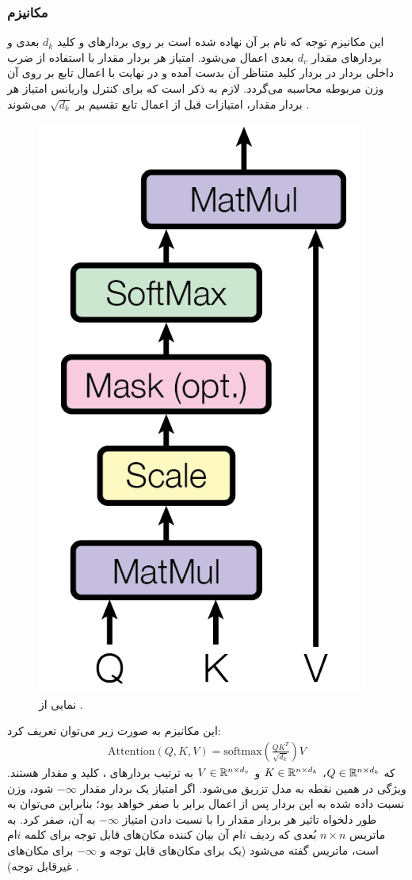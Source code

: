 \subsubsection{مکانیزم
	}
این مکانیزم توجه که نام \dotattention{} بر آن نهاده شده است بر روی بردارهای \query{} و کلید $d_k$ بعدی و بردارهای مقدار $d_v$ بعدی اعمال می‌شود. امتیاز هر بردار مقدار با استفاده از ضرب داخلی بردار \query{} در بردار کلید متناظر آن بدست آمده و در نهایت با اعمال تابع \softmax{} بر روی آن وزن مربوطه محاسبه می‌گردد. لازم به ذکر است که برای کنترل واریانس امتیاز هر بردار مقدار، امتیازات قبل از اعمال تابع \softmax{} تقسیم بر $\sqrt{d_k}$ می‌شوند \cite{transformer}.
\begin{figure}[H]
	\centering
	\includegraphics[width=.25
		\textwidth]{images/attention1.png}
	\caption{نمایی از \dotattention{}
    \cite{transformer}.}
\end{figure}
این مکانیزم به صورت زیر می‌توان تعریف کرد:
\begin{align}
	\text{Attention}(Q, K, V) = \text{softmax}(\frac{QK^T}{\sqrt{d_k}})V
\end{align}
که
$Q \in {\mathbb{R}}^{n \times d_k}$،
$K \in {\mathbb{R}}^{n \times d_k}$ و
$V \in {\mathbb{R}}^{n \times d_v}$
به ترتیب بردارهای \query{}، کلید و مقدار هستند.
ویژگی \autoregressive{} در همین نقطه به مدل تزریق می‌شود. اگر امتیاز یک بردار مقدار $-\infty$ شود، وزن نسبت داده شده به این بردار پس از اعمال \softmax{} برابر با صفر خواهد بود؛ بنابراین می‌توان به طور دلخواه تاثیر هر بردار مقدار را با نسبت دادن  امتیاز $-\infty$ به آن، صفر کرد. به ماتریس $n \times n$ بُعدی که ردیف $i$ام آن بیان کننده مکان‌های قابل توجه برای کلمه $i$ام است، ماتریس
گفته می‌شود (یک برای مکان‌های قابل توجه و $-\infty$ برای مکان‌های غیرقابل توجه) \cite{transformer}.

